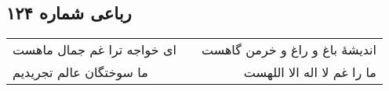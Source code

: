 \begin{center}
\section*{رباعی شماره ۱۲۴}
\label{sec:sh124}
\begin{longtable}{l p{0.5cm} r}
ای خواجه ترا غم جمال ماهست
&&
اندیشهٔ باغ و راغ و خرمن گاهست
\\
ما سوختگان عالم تجریدیم
&&
ما را غم لا اله الا اللهست
\\
\end{longtable}
\end{center}
